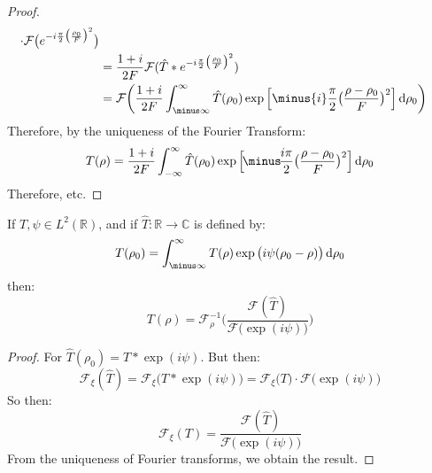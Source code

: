 \begin{proof}
\begin{subequations}
\begin{align}
                    \cdot\mathcal{F}
                    \big(e^{-i\frac{\pi}{2}
                    \big(\frac{\rho_0}{F}\big)^2}\big)\\
                &=\frac{1+i}{2F}\mathcal{F}
                    (\hat{T}*e^{-i\frac{\pi}{2}
                    \big(\frac{\rho_0}{F}\big)^2})\\
            &=\mathcal{F}\bigg(\frac{1+i}{2F}
                \int_{\minus\infty}^{\infty}\hat{T}(\rho_{0})
                \exp\Big[\minus{i}\frac{\pi}{2}\big(
                    \frac{\rho-\rho_{0}}{F}\big)^{2}\Big]
                \diff{\rho_{0}}\bigg)
            \end{align}
        \end{subequations}
        Therefore, by the uniqueness of the Fourier Transform:
        \begin{equation}
            T(\rho)=\frac{1+i}{2F}\int_{-\infty}^{\infty}
                \hat{T}(\rho_{0})\exp\Big[
                    \!\minus\!\frac{i\pi}{2}
                    \big(\frac{\rho-\rho_{0}}{F}\big)^{2}
                \Big]\diff{\rho_{0}}
        \end{equation}
        Therefore, etc.
    \end{proof}
    \begin{theorem}
            If $T,\psi\in{L}^{2}(\mathbb{R})$, and if
            $\hat{T}:\mathbb{R}\rightarrow\mathbb{C}$
            is defined by:
            \begin{equation}
            T(\rho_{0})=\int_{\minus\infty}^{\infty}
                T(\rho)\exp\big(i\psi(\rho_{0}-\rho)\big)
                \diff{\rho_{0}}
            \end{equation}
            then:
            \begin{equation}
                T(\rho)=\mathcal{F}^{\minus{1}}_{\rho}\Big(
                    \frac{\mathcal{F}(\hat{T})}
                        {\mathcal{F}\big(\exp(i\psi)\big)}
                    \Big)
            \end{equation}
    \end{theorem}
    \begin{proof}
        For $\hat{T}(\rho_{0})=T*\exp(i\psi)$. But then:
        \begin{equation}
            \mathcal{F}_{\xi}(\hat{T})
            =\mathcal{F}_{\xi}\big(T*\exp(i\psi)\big)
            =\mathcal{F}_{\xi}\big(T\big)\cdot
            \mathcal{F}\big(\exp(i\psi)\big)
        \end{equation}
        So then:
        \begin{equation}
            \mathcal{F}_{\xi}(T)
            =\frac{\mathcal{F}(\hat{T})}
                {\mathcal{F}\big(\exp(i\psi)\big)}
        \end{equation}
        From the uniqueness of Fourier transforms, we
        obtain the result.
    \end{proof}
